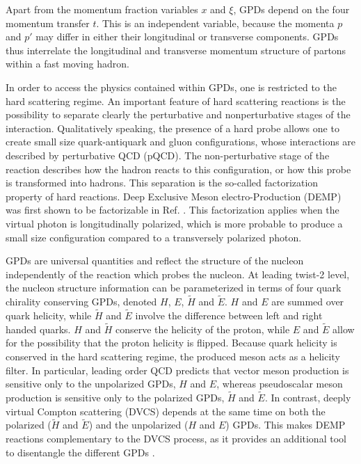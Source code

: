 Apart from the momentum fraction variables $x$ and $\xi$, GPDs depend on the
four momentum transfer $t$.  This is an independent variable, because the
momenta $p$ and $p'$ may differ in either their longitudinal or transverse
components.  GPDs thus interrelate the longitudinal and transverse momentum
structure of partons within a fast moving hadron.

In order to access the physics contained within GPDs, one is restricted to the
hard scattering regime.  An important feature of hard scattering reactions is
the possibility to separate clearly the perturbative and nonperturbative stages
of the interaction.  Qualitatively speaking, the presence of a hard probe
allows one to create small size quark-antiquark and gluon configurations, whose
interactions are described by perturbative QCD (pQCD).  The non-perturbative
stage of the reaction describes how the hadron reacts to this configuration, or
how this probe is transformed into hadrons.  This separation is the so-called
factorization property of hard reactions.  Deep Exclusive Meson
electro-Production (DEMP) was first shown to be factorizable in
Ref. \cite{Co97}.  This factorization applies when the virtual photon is
longitudinally polarized, which is more probable to produce a small size
configuration compared to a transversely polarized photon.

GPDs are universal quantities and reflect the structure of the nucleon
independently of the reaction which probes the nucleon.  At leading twist-2
level, the nucleon structure information can  be parameterized in terms of four
quark chirality conserving GPDs, denoted $H$, $E$, $\tilde{H}$ and $\tilde{E}$.
$H$ and $E$ are summed over quark helicity, while $\tilde{H}$ and $\tilde{E}$
involve the difference between  left and right handed quarks.  $H$ and
$\tilde{H}$ conserve the helicity of the proton, while $E$ and $\tilde{E}$
allow for the possibility that the proton helicity is flipped.  Because quark
helicity is conserved in the hard scattering regime, the produced meson acts as
a helicity filter.  In particular, leading order QCD predicts that vector meson
production is sensitive only to the unpolarized GPDs, $H$ and $E$, whereas
pseudoscalar meson production is sensitive only to the polarized GPDs,
$\tilde{H}$ and $\tilde{E}$.  In contrast, deeply virtual Compton scattering
(DVCS) depends at the same time on both the polarized ($\tilde{H}$ and  
$\tilde{E}$) and the unpolarized ($H$ and $E$) GPDs.  This makes DEMP
reactions complementary to the DVCS process, as it
provides an additional tool to disentangle the different GPDs \cite{Go01}.


